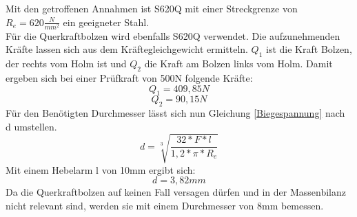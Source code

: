 Mit den getroffenen Annahmen ist S620Q mit einer Streckgrenze von $R_{e}=620\frac{N}{mm^{2}}$ ein geeigneter Stahl.\\ 
Für die Querkraftbolzen wird ebenfalls S620Q verwendet. Die aufzunehmenden Kräfte lassen sich aus dem Kräftegleichgewicht ermitteln. $Q_{1}$ ist die Kraft Bolzen, der rechts vom Holm ist und $Q_{2}$ die Kraft am Bolzen links vom Holm. Damit ergeben sich bei einer Prüfkraft von 500N folgende Kräfte:
$$Q_{1}=409,85N$$
$$Q_{2}=90,15N$$
Für den Benötigten Durchmesser lässt sich nun Gleichung \ref{Biegespannung} nach d umstellen.
\begin{equation}
d=\sqrt[3]{\frac{32*F*l}{1,2*\pi*R_{e}}}
\end{equation}
Mit einem Hebelarm l von 10mm ergibt sich:
\begin{equation}
d=3,82mm
\end{equation}
Da die Querkraftbolzen auf keinen Fall versagen dürfen und in der Massenbilanz nicht relevant sind, werden sie mit einem Durchmesser von 8mm bemessen.\cite{item6}\\
 
 
 
 
  
 
